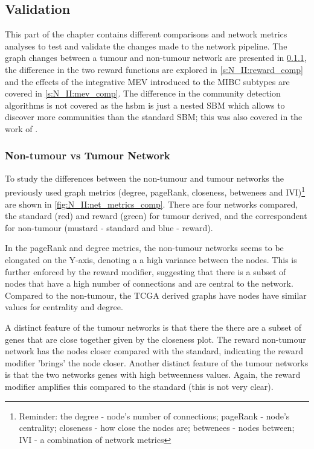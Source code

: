 \subsection{Validation} \label{s:N_II:validation}


This part of the chapter contains different comparisons and network metrics analyses to test and validate the changes made to the network pipeline. The graph changes between a tumour and non-tumour network are presented in \cref{s:N_II:net_comp}, the difference in the two reward functions are explored in \cref{s:N_II:reward_comp} and the effects of the integrative MEV introduced to the MIBC subtypes are covered in \cref{s:N_II:mev_comp}. The difference in the community detection algorithms is not covered as the \acrfull{hsbm} is just a nested SBM which allows to discover more communities than the standard SBM; this was also covered in the work of \citet{Peixoto2014-yb}.


\subsubsection{Non-tumour vs Tumour Network} \label{s:N_II:net_comp}

To study the differences between the non-tumour and tumour networks the previously used graph metrics (degree, pageRank, closeness, betwenees and IVI)\footnote{Reminder: the degree - node's number of connections; pageRank - node's centrality; closeness - how close the nodes are; betwenees - nodes between; IVI - a combination of network metrics} are shown in \cref{fig:N_II:net_metrics_comp}. There are four networks compared, the standard (red) and reward (green) for tumour derived, and the correspondent for non-tumour (mustard - standard and blue - reward).

In the pageRank and degree metrics, the non-tumour networks seems to be elongated on the Y-axis, denoting a a high variance between the nodes. This is further enforced by the reward modifier, suggesting that there is a subset of nodes that have a high number of connections and are central to the network. Compared to the non-tumour, the TCGA derived graphs have nodes have similar values for centrality and degree. 

A distinct feature of the tumour networks is that there the there are a subset of genes that are close together given by the closeness plot. The reward non-tumour network has the nodes closer compared with the standard, indicating the reward modifier 'brings' the node closer. Another distinct feature of the tumour networks is that the two networks genes with high betweenness values. Again, the reward modifier amplifies this compared to the standard (this is not very clear).

